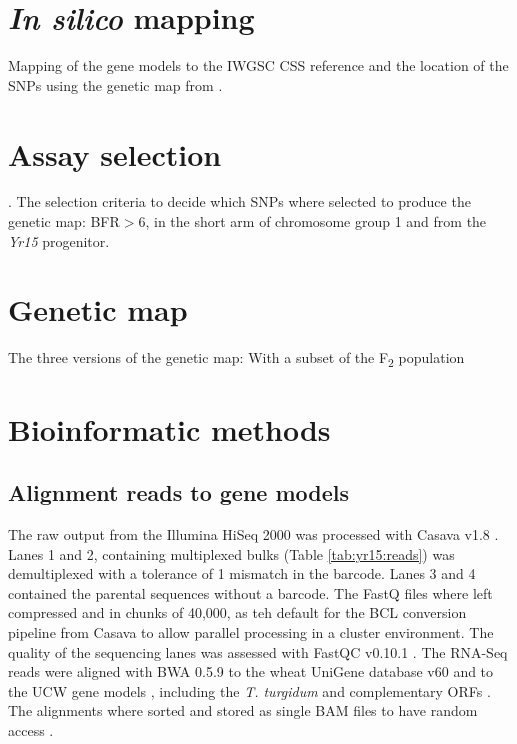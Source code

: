 \section{\textit{In silico} mapping}
Mapping of the gene models to the IWGSC CSS \citet{Mayer2014} reference and the location of the SNPs using the genetic map from \citet{Wang2014}.

\section{Assay selection}. 
The selection criteria to decide which SNPs where selected to produce the genetic map: BFR$>$6, in the short arm of chromosome group 1 and from the \textit{Yr15} progenitor.

\section{Genetic map} 
\label{yr15:geneticMap}
The three versions of the genetic map: With a subset of the F\textsubscript{2} population

\section{Bioinformatic methods}

\subsection{Alignment reads to gene models}

The raw output from the Illumina HiSeq 2000 was processed with Casava v1.8 \citep{casavaBCL}. 
Lanes 1 and 2, containing multiplexed bulks (Table \ref{tab:yr15:reads}) was demultiplexed with a tolerance of 1 mismatch in the barcode. 
Lanes 3 and 4 contained the parental sequences without a barcode. 
The FastQ files where left compressed and in chunks of 40,000, as teh default for the BCL conversion pipeline from Casava to allow parallel processing in a cluster environment. 
The quality of the sequencing lanes was assessed with FastQC v0.10.1 \citep{fastqc}. 
The RNA-Seq reads were aligned with BWA 0.5.9 \citep{Li2009} to the wheat UniGene database v60 \citep{PontiusJUWagnerL2002} and to the UCW gene models \citep{Krasileva2013}, including the \textit{T. turgidum} and complementary ORFs \citep{MASWheat2013}.
The alignments where sorted and stored as single BAM files to have random access \citep{Li2009a}. 


